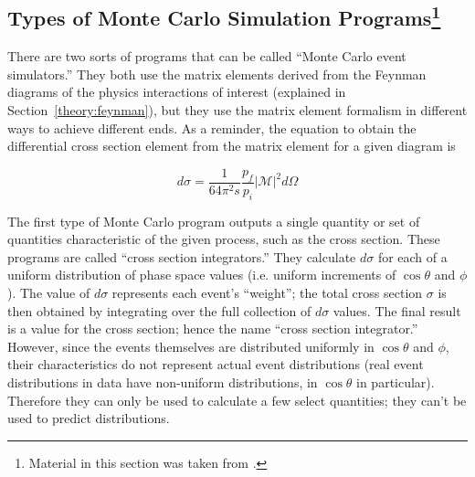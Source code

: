 \subsection{Types of Monte Carlo Simulation Programs\footnote{Material in this section was taken from \cite{MCLesHouchesGuide}.}}
\label{sim:MCexplain}




There are two sorts of programs that can be called 
``Monte Carlo event simulators.''  
They both use the matrix elements derived from 
the Feynman diagrams of the physics interactions of interest 
(explained in Section~\ref{theory:feynman}), %
but they use the matrix element formalism 
in different ways to achieve different ends.  
As a reminder, the equation to obtain the 
differential cross section element %
from the matrix element for a given diagram is 

\[
d \sigma
= \frac{1}{64 \pi^2 s} \frac{p_f}{p_i} \left| \mathcal{M} \right| ^2 d \Omega
\]

The first type of Monte Carlo program outputs 
a single quantity or set of quantities characteristic 
of the given process, 
such as the cross section.  
These programs are called ``cross section integrators.''  
They calculate 
$d\sigma$ for each of a uniform distribution of 
phase space values (i.e. uniform increments 
of $\cos\theta$ and $\phi$).  
The value of $d\sigma$ represents each event's ``weight''; 
the total cross section $\sigma$ is then obtained 
by integrating over the full collection of $d\sigma$ values.  
The final result is a value for the cross section; 
hence the name ``cross section integrator.''  
However, since the events themselves are distributed 
uniformly in $\cos\theta$ and $\phi$, 
their characteristics 
do not represent actual event distributions 
(real event distributions in data have 
non-uniform distributions, 
in $\cos\theta$ in particular).  
Therefore they can only be used to calculate 
a few select quantities; 
they can't be used to predict distributions.  

